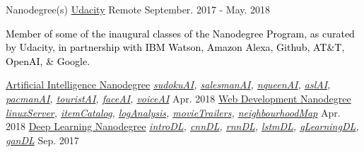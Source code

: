 

\begin{cventries}


	\cventry
	{Nanodegree(s)} %
	{\href{https://www.udacity.com/}{Udacity}} %
	{Remote} %
	{September. 2017 - May. 2018} %
	{\textcolor{black}{Member of some of the inaugural classes of the Nanodegree Program, as curated by Udacity, in partnership with IBM Watson, Amazon Alexa, Github, AT\&T, OpenAI, \& Google.}
		\begin{cvhonors}
			\cvhonor
			{\href{https://confirm.udacity.com/HJZHVDJH}{Artificial Intelligence Nanodegree}} %
			{\textit{
					\href{https://github.com/Vvkmnn/sudokuAI}{sudokuAI},
					\href{https://github.com/Vvkmnn/salesmanAI}{salesmanAI},
					\href{https://github.com/Vvkmnn/nqueenAI}{nqueenAI},
					\href{https://github.com/Vvkmnn/aslAI}{aslAI},
					\href{https://github.com/Vvkmnn/pacmanAI}{pacmanAI},
					\href{https://github.com/Vvkmnn/touristAI}{touristAI},
					\href{https://github.com/Vvkmnn/faceAI}{faceAI},
					\href{https://github.com/Vvkmnn/voiceAI}{voiceAI}
				}
			} %
			{} %
			{Apr. 2018} %
			\cvhonor
			{\href{https://confirm.udacity.com/GTSYRMGY}{Web Development Nanodegree}} %
			{ \textit{
					\href{https://github.com/Vvkmnn/linuxServer}{linuxServer}, \href{https://github.com/Vvkmnn/itemCatalog}{itemCatalog}, \href{https://github.com/Vvkmnn/logAnalysis}{logAnalysis}, \href{https://github.com/Vvkmnn/movieTrailers}{movieTrailers},
					\href{https://github.com/Vvkmnn/neighbourhoodMap}{neighbourhoodMap}
				}
			} %
			{} %
			{Apr. 2018} %
			\cvhonor
			{\href{https://confirm.udacity.com/XXZTHYHT}{Deep Learning Nanodegree}} %
			{\textit{
					\href{https://github.com/Vvkmnn/introDL}{introDL},
					\href{https://github.com/Vvkmnn/cnnDL}{cnnDL},
					\href{https://github.com/Vvkmnn/rnnDL}{rnnDL},
					\href{https://github.com/Vvkmnn/lstmDL}{lstmDL},
					\href{https://github.com/Vvkmnn/qLearningDL}{qLearningDL},
					\href{https://github.com/Vvkmnn/ganD}{ganDL}
				}
			} %
			{} %
			{Sep. 2017} %
		\end{cvhonors}
		\newline\newline\newline
	}




\end{cventries}
